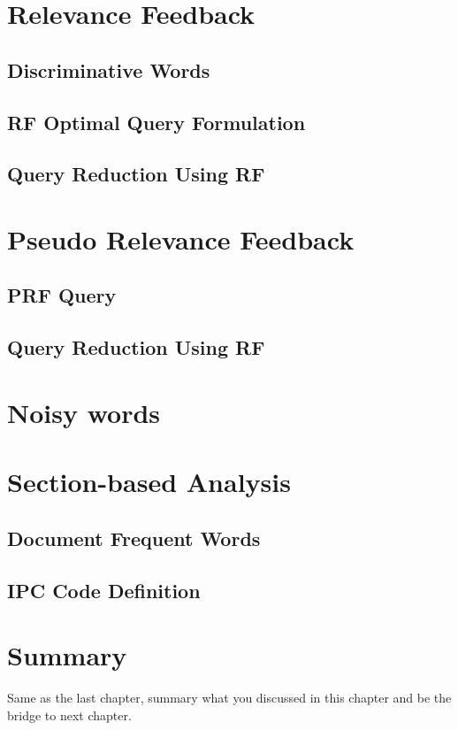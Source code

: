 \section{Relevance Feedback}

\subsection{Discriminative Words}
\label{sec:discriminative}

\subsection{RF Optimal Query Formulation}
\label{sec:formulation}

\subsection{Query Reduction Using RF}

\section{Pseudo Relevance Feedback}

\subsection{PRF Query}
\subsection{Query Reduction Using RF}

\section{Noisy words}

\section{Section-based Analysis}

\subsection{Document Frequent Words}

\subsection{IPC Code Definition}

\section{Summary}
Same as the last chapter, summary what you discussed in this chapter and
be the bridge to next chapter.
